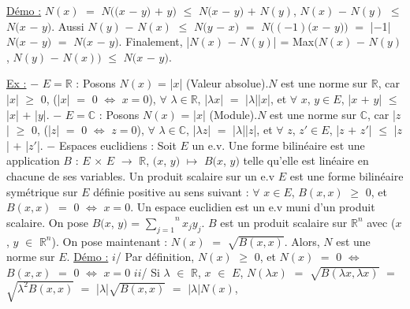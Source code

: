 \documentclass{article}
\begin{document}
\parindent=0cm
\smallbreak
\underline{Démo :} 
\smallbreak
\parindent=1cm
$N(x)$ $=$ $N((x$ $-$ $y)$ $+$ $y)$ $\leqslant$ $N(x$ $-$ $y)$ $+$ $N(y)$, $N(x)$ $-$ $N(y)$ $\leqslant$ $N(x$ $-$ $y)$. \smallbreak Aussi $N(y)$ $-$ $N(x)$ $\leqslant$ $N(y$ $-$ $x)$ $=$ $N((-1)(x$ $-$ $y))$ $=$ |$-$1|$N(x$ $-$ $y)$ $=$ $N(x$ $-$ $y)$. \smallbreak Finalement, |$N(x)$ $-$ $N(y)$| = Max$(N(x)$ $-$ $N(y)$, $N(y)$ $-$ $N(x))$ $\leqslant$ $N(x$ $-$ $y)$.
\parindent=0cm
\smallbreak

\underline{Ex :}
\parindent=1cm
\smallbreak
$-$ $E = \mathbb{R}$ : Posons $N(x)$ = |$x$| (Valeur absolue).\smallbreak $N$ est une norme sur $\mathbb{R}$, car |$x$| $\geqslant$ $0$, (|$x$| $=$ $0$ $\Longleftrightarrow$ $x = 0$), \smallbreak $\forall$ $\lambda \in \mathbb{R}$, |$\lambda x$| $=$ |$\lambda$||$x$|, et $\forall$ $x$, $y \in E$, |$x$ $+$ $y$| $\leqslant$ |$x$| $+$ |$y$|.
\smallbreak
$-$ $E = \mathbb{C}$ : Posons $N(x)$ = |$x$| (Module).\smallbreak $N$ est une norme sur $\mathbb{C}$, car |$z$| $\geqslant$ $0$, (|$z$| $=$ $0$ $\Longleftrightarrow$ $z = 0$), \smallbreak $\forall$ $\lambda \in \mathbb{C}$, |$\lambda z$| $=$ |$\lambda$||$z$|, et $\forall$ $z$, $z' \in E$, |$z$ $+$ $z'$| $\leqslant$ |$z$| $+$ |$z'$|.
\smallbreak
$-$ Espaces euclidiens :
\smallbreak Soit $E$ un e.v. Une forme bilinéaire est une application $B$ : $E$ $\times$ $E$ $\rightarrow$ $\mathbb{R}$, $(x$, $y)$ $\mapsto$ $B(x$, $y)$ telle qu'elle est \smallbreak linéaire en chacune de ses variables. \smallbreak Un produit scalaire sur un e.v $E$ est une forme bilinéaire symétrique sur $E$ définie positive au sens suivant : \smallbreak $\forall$ $x \in E$,  $B(x,x)$ $\geqslant$ $0$, et $B(x,x)$ $=$ $0$ $\Longleftrightarrow$ $x = 0$. Un espace euclidien est un e.v muni d'un produit scalaire. \smallbreak On pose $B(x$, $y)$ = $\overset{n}{\underset{j = 1}{\sum}} x_j y_j$. $B$ est un produit scalaire sur $\mathbb{R}^n$ avec ($x$, $y$ $\in$ $\mathbb{R}^n$).
\smallbreak
On pose maintenant : $N(x)$ $=$ $\sqrt{B(x, x)}$. Alors, $N$ est une norme sur $E$.\smallbreak
\underline{Démo :} \parindent=2cm \smallbreak
$i$/ Par définition, $N(x)$ $\geqslant$ $0$, et $N(x)$ $=$ $0$ $\Longleftrightarrow$ $B(x,x)$ $=$ $0$ $\Longleftrightarrow$ $x = 0$ \smallbreak
$ii$/ Si $\lambda$ $\in$ $\mathbb{R}$, $x$ $\in$ $E$, $N(\lambda x)$ $=$ $\sqrt{B(\lambda x,\lambda x)} $ $=$ $\sqrt{\lambda^2 B(x,x)}$ $=$ |$\lambda$|$\sqrt{B(x,x)}$ $=$ $|\lambda|N(x)$,\smallbreak
\end{document}
